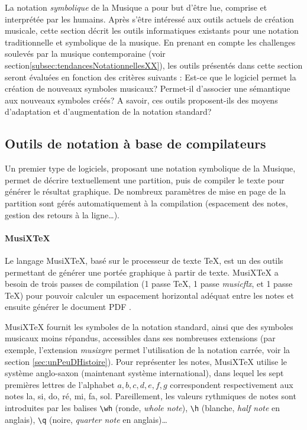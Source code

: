 La notation \textit{symbolique} de la Musique a pour but d'être lue, comprise et interprétée par les humains.  
Après s'être intéressé aux outils actuels de création musicale, cette section décrit les outils informatiques existants pour une notation traditionnelle et symbolique de la musique. 
En prenant en compte les challenges soulevés par la musique contemporaine (voir section\ref{subsec:tendancesNotationnellesXX}), les outils présentés dans cette section seront évaluées en fonction des critères suivants :
Est-ce que le logiciel permet la création de nouveaux symboles musicaux? Permet-il d'associer une sémantique aux nouveaux symboles créés?
A savoir, ces outils proposent-ils des moyens d'adaptation et d'augmentation de la notation standard?

\subsection{Outils de notation à base de compilateurs}
\label{subsec:notationABaseCompilateurs}
Un premier type de logiciels, proposant une notation symbolique de la Musique, permet de décrire textuellement une partition, puis de compiler le texte pour générer le résultat graphique.
De nombreux paramètres de mise en page de la partition sont gérés automatiquement à la compilation (espacement des notes, gestion des retours à la ligne…).

\paragraph{MusiXTeX} Le langage MusiXTeX, basé sur le processeur de texte \TeX, est un des outils permettant de générer une portée graphique à partir de texte. MusiXTeX a besoin de trois passes de compilation (1 passe \TeX, 1 passe \textit{musicflx}, et 1 passe \TeX) pour pouvoir calculer un espacement horizontal adéquat entre les notes et ensuite générer le document PDF \cite{musixtex2016}.

MusiXTeX fournit les symboles de la notation standard, ainsi que des symboles musicaux moins répandus, accessibles dans ses nombreuses extensions (par exemple, l'extension \textit{musixgre} permet l'utilisation de la notation carrée, voir la section \ref{sec:unPeuDHistoire}).
Pour représenter les notes, MusiXTeX utilise le système anglo-saxon (maintenant système international), dans lequel les sept premières lettres de l'alphabet $a, b, c, d, e, f, g$ correspondent respectivement aux notes la, si, do, ré, mi, fa, sol. Pareillement, les valeurs rythmiques de notes sont introduites par les balises \lstinline{\wh} (ronde, \textit{whole note}), \lstinline{\h} (blanche, \textit{half note} en anglais), \lstinline{\q} (noire, \textit{quarter note} en anglais)… 

